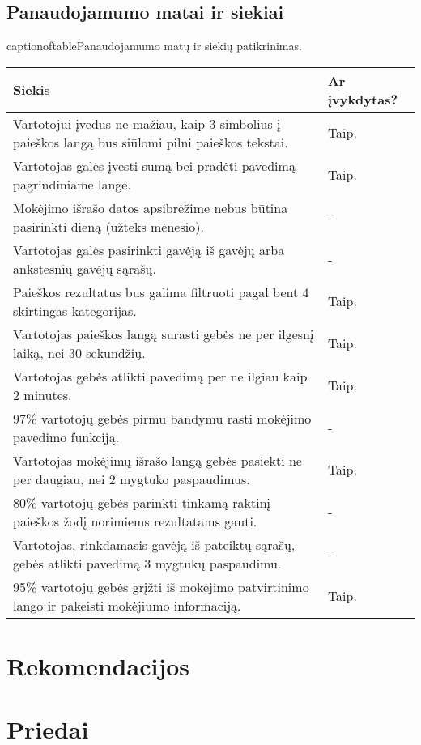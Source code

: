 \documentclass[oneside]{VUMIFPSkursinis}
\begin{document}
\subsection{Panaudojamumo matai ir siekiai}
\begin{center}
	captionof{table}{Panaudojamumo matų ir siekių patikrinimas.}
    \begin{tabular}{ |p{12cm}| p{3cm} |}
    \hline
	Siekis & Ar įvykdytas? \\ \hline
	Vartotojui įvedus ne mažiau, kaip 3 simbolius į paieškos langą bus siūlomi pilni paieškos tekstai. & Taip. \\ \hline
	Vartotojas galės įvesti sumą bei pradėti pavedimą pagrindiniame lange. & Taip. \\ \hline
	Mokėjimo išrašo datos apsibrėžime nebus būtina pasirinkti dieną (užteks mėnesio). & - \\ \hline
	Vartotojas galės pasirinkti gavėją iš gavėjų arba ankstesnių gavėjų sąrašų. & - \\ \hline
	Paieškos rezultatus bus galima filtruoti pagal bent 4 skirtingas kategorijas. & Taip. \\ \hline
	Vartotojas paieškos langą surasti gebės ne per ilgesnį laiką, nei 30 sekundžių. & Taip. \\ \hline
	Vartotojas gebės atlikti pavedimą per ne ilgiau kaip 2 minutes. & Taip. \\ \hline
	97\% vartotojų gebės pirmu bandymu rasti mokėjimo pavedimo funkciją. & - \\ \hline
	Vartotojas mokėjimų išrašo langą gebės pasiekti ne per daugiau, nei 2 mygtuko paspaudimus. & Taip. \\ \hline
	80\% vartotojų gebės parinkti tinkamą raktinį paieškos žodį norimiems rezultatams gauti. & - \\ \hline
	Vartotojas, rinkdamasis gavėją iš pateiktų sąrašų, gebės atlikti pavedimą 3 mygtukų paspaudimu. & - \\ \hline
	95\% vartotojų gebės grįžti iš mokėjimo patvirtinimo lango ir pakeisti mokėjiumo informaciją. & Taip. \\ \hline

    \end{tabular}
\end{center}
\section{Rekomendacijos}
\section{Priedai}
\end{document}

